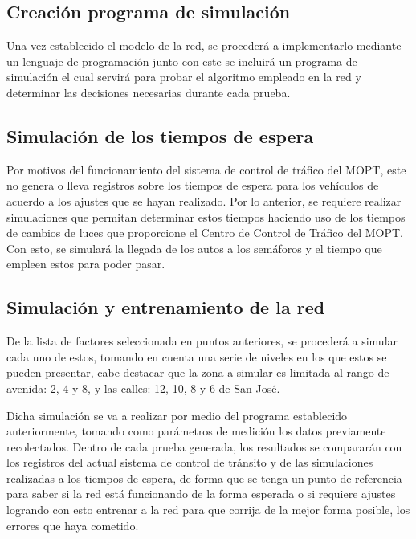 \subsection{Creaci\'{o}n programa de simulaci\'{o}n}
	
	Una vez establecido el modelo de la red, se proceder\'{a} a implementarlo
	mediante un lenguaje de programaci\'{o}n junto con este se incluir\'{a} un
	programa de simulaci\'{o}n el cual servir\'{a} para probar el algoritmo
	empleado en la red y determinar las decisiones necesarias durante cada prueba.

\subsection{Simulaci\'{o}n de los tiempos de espera}

	Por motivos del funcionamiento del sistema de control de tr\'{a}fico del MOPT,
este no genera o lleva registros sobre los tiempos de espera para los
veh\'{i}culos de acuerdo a los ajustes que se hayan realizado. Por lo anterior,
se requiere realizar simulaciones que permitan determinar estos tiempos haciendo
uso de los tiempos de cambios de luces que proporcione el Centro de Control de
Tr\'{a}fico del MOPT. Con esto, se simular\'{a} la llegada de los autos a los
sem\'{a}foros y el tiempo que empleen estos para poder pasar.

\subsection{Simulaci\'{o}n y entrenamiento de la red}

	De la lista de factores seleccionada en puntos anteriores, se proceder\'{a} a
simular cada uno de estos, tomando en cuenta una serie de niveles en los que
estos se pueden presentar, cabe destacar que la zona a simular es limitada al
rango de avenida: 2, 4 y 8,  y las calles: 12, 10, 8 y 6 de San Jos\'{e}.

	Dicha simulaci\'{o}n se va a realizar por medio del programa establecido
anteriormente, tomando como par\'{a}metros de medici\'{o}n los datos previamente
recolectados. Dentro de cada prueba generada, los resultados se comparar\'{a}n
con los registros del actual sistema de control de tr\'{a}nsito y de las
simulaciones realizadas a los tiempos de espera, de forma que se tenga un punto
de referencia para saber si la red est\'{a} funcionando de la forma esperada o si requiere ajustes logrando con esto entrenar a la red para
que corrija de la mejor forma posible, los errores que haya cometido.

